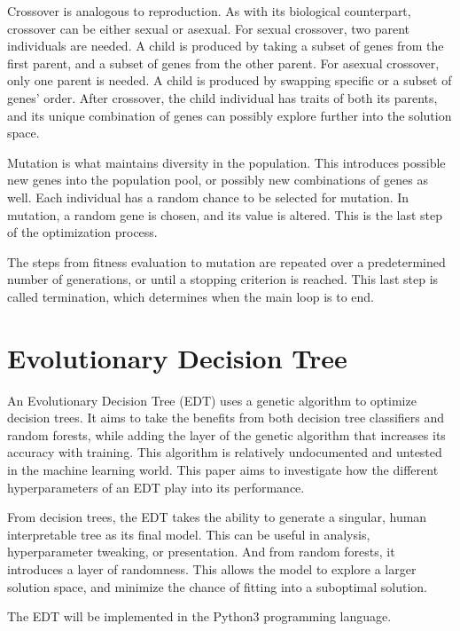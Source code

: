 \documentclass[12pt]{article}
\begin{document}
Crossover is analogous to reproduction. As with its biological counterpart, crossover can be either sexual or asexual. For sexual crossover, two parent individuals are needed. A child is produced by taking a subset of genes from the first parent, and a subset of genes from the other parent. For asexual crossover, only one parent is needed. A child is produced by swapping specific or a subset of genes' order. After crossover, the child individual has traits of both its parents, and its unique combination of genes can possibly explore further into the solution space.

Mutation is what maintains diversity in the population. This introduces possible new genes into the population pool, or possibly new combinations of genes as well. Each individual has a random chance to be selected for mutation. In mutation, a random gene is chosen, and its value is altered. This is the last step of the optimization process.

The steps from fitness evaluation to mutation are repeated over a predetermined number of generations, or until a stopping criterion is reached. This last step is called termination, which determines when the main loop is to end.

\section{Evolutionary Decision Tree}

An Evolutionary Decision Tree (EDT) uses a genetic algorithm to optimize decision trees. It aims to take the benefits from both decision tree classifiers and random forests, while adding the layer of the genetic algorithm that increases its accuracy with training. This algorithm is relatively undocumented and untested in the machine learning world. This paper aims to investigate how the different hyperparameters of an EDT play into its performance.

From decision trees, the EDT takes the ability to generate a singular, human interpretable tree as its final model. This can be useful in analysis, hyperparameter tweaking, or presentation. And from random forests, it introduces a layer of randomness. This allows the model to explore a larger solution space, and minimize the chance of fitting into a suboptimal solution.


The EDT will be implemented in the Python3 programming language.
\end{document}
